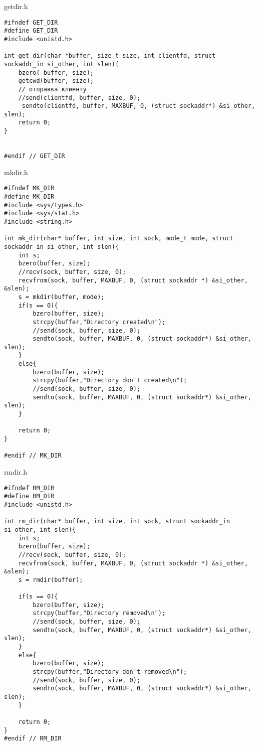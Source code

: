 \documentclass[12pt,a4paper]{report}
\begin{document}
getdir.h
\begin{lstlisting}
#ifndef GET_DIR
#define GET_DIR
#include <unistd.h>

int get_dir(char *buffer, size_t size, int clientfd, struct sockaddr_in si_other, int slen){
    bzero( buffer, size);
    getcwd(buffer, size);
    // отправка клиенту
    //send(clientfd, buffer, size, 0);
     sendto(clientfd, buffer, MAXBUF, 0, (struct sockaddr*) &si_other, slen);
    return 0;
}


#endif // GET_DIR
\end{lstlisting}

mkdir.h
\begin{lstlisting}
#ifndef MK_DIR
#define MK_DIR
#include <sys/types.h>
#include <sys/stat.h>
#include <string.h>

int mk_dir(char* buffer, int size, int sock, mode_t mode, struct sockaddr_in si_other, int slen){
    int s;
    bzero(buffer, size);
    //recv(sock, buffer, size, 0);
    recvfrom(sock, buffer, MAXBUF, 0, (struct sockaddr *) &si_other, &slen);
    s = mkdir(buffer, mode);
    if(s == 0){
        bzero(buffer, size);
        strcpy(buffer,"Directory created\n");
        //send(sock, buffer, size, 0);
        sendto(sock, buffer, MAXBUF, 0, (struct sockaddr*) &si_other, slen);
    }
    else{
        bzero(buffer, size);
        strcpy(buffer,"Directory don't created\n");
        //send(sock, buffer, size, 0);
        sendto(sock, buffer, MAXBUF, 0, (struct sockaddr*) &si_other, slen);
    }

    return 0;
}

#endif // MK_DIR
\end{lstlisting}

rmdir.h
\begin{lstlisting}
#ifndef RM_DIR
#define RM_DIR
#include <unistd.h>

int rm_dir(char* buffer, int size, int sock, struct sockaddr_in si_other, int slen){
    int s;
    bzero(buffer, size);
    //recv(sock, buffer, size, 0);
    recvfrom(sock, buffer, MAXBUF, 0, (struct sockaddr *) &si_other, &slen);
    s = rmdir(buffer);

    if(s == 0){
        bzero(buffer, size);
        strcpy(buffer,"Directory removed\n");
        //send(sock, buffer, size, 0);
        sendto(sock, buffer, MAXBUF, 0, (struct sockaddr*) &si_other, slen);
    }
    else{
        bzero(buffer, size);
        strcpy(buffer,"Directory don't removed\n");
        //send(sock, buffer, size, 0);
        sendto(sock, buffer, MAXBUF, 0, (struct sockaddr*) &si_other, slen);
    }

    return 0;
}
#endif // RM_DIR
\end{lstlisting}
\end{document}

